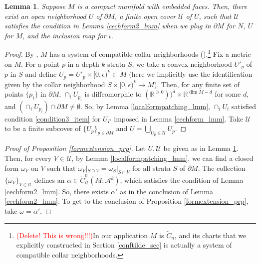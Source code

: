 \documentclass[11pt]{article}
\newtheorem{lmm}[thm]{Lemma}
\theoremstyle{definition}
\theoremstyle{remark}
\def\wt#1{\widetilde{#1}}
\def\R{\mathbb{R}}
\def\cA{\mathcal{A}}
\def\cU{\mathcal{U}}
\begin{document}
\begin{appendices}
\begin{lmm}\label{cover_lmm}
Suppose $M$ is a compact manifold with embedded faces. Then, there exist an open neighborhood $U$ of $\partial M$, a finite open cover $\cU$ of $U$, such that $\cU$ satisfies the condition in Lemma \ref{cechform2_lmm} when we plug in $\partial M$ for $N$, $U$ for $M$, and the inclusion map for $\iota$. 
\end{lmm}
\begin{proof}
By \cite[Theorem 17]{Hajek}, $M$ has a system of compatible collar neighborhoods (\cite[Definition 35]{Hajek}).\footnote{\textcolor{red}{(Delete! This is wrong!!!)}In our application $M$ is $\wt{C}_n$, and its charts that we explicitly constructed in Section \ref{conftilde_sec} is actually a system of compatible collar neighborhoods.}
Fix a metric on $M$. 
For a point $p$ in a depth-$k$ strata $S$, we take a convex neighborhood $U'_p$ of $p$ in $S$ and define $U_p=U'_p\times[0,\epsilon)^k\subset M$ (here we implicitly use the identification given by the collar neighborhood $S\times[0,\epsilon)^k\to M$). 
Then, for any finite set of points $\{p_i\}$ in $\partial M$, $\cap_iU_{p_i}$ is diffeomorphic to $(\R^{\ge0}))^d\times\R^{\dim{M}-d}$ for some $d$, and $(\cap_iU_{p_i})\cap\partial M\neq\emptyset$.
So, by Lemma \ref{localformpatching_lmm}, $\cap_iU_i$ satisfied condition \ref{condition3_item} for $U_{I'}$ imposed in Lemma \ref{cechform_lmm}. 
Take $\cU$ to be a finite subcover of $\{U_p\}_{p\in\partial M}$ and $U=\bigcup_{U_p\in\cU}U_p$. 
\end{proof}

\begin{proof}[Proof of Proposition \ref{formextension_prp}]
Let $U,\cU$ be given as in Lemma \ref{cover_lmm}. 
Then, for every $V\in\cU$, by Lemma \ref{localformpatching_lmm}, we can find a closed form $\omega_V$ on $V$ such that $\omega_V|_{S\cap V}=\omega_S|_{S\cap V}$ for all strata $S$ of $\partial M$. 
The collection $\{\omega_V\}_{V\in\cU}$ defines an $\alpha\in\check{C}^0_\cU(M;\cA^k)$, which satisfies the condition of Lemma \ref{cechform2_lmm}. 
So, there exists $\alpha'$ as in the conclusion of Lemma \ref{cechform2_lmm}. 
To get to the conclusion of Proposition \ref{formextension_prp}, take $\omega=\alpha'$. 
\end{proof}

\end{appendices}
\end{document}

